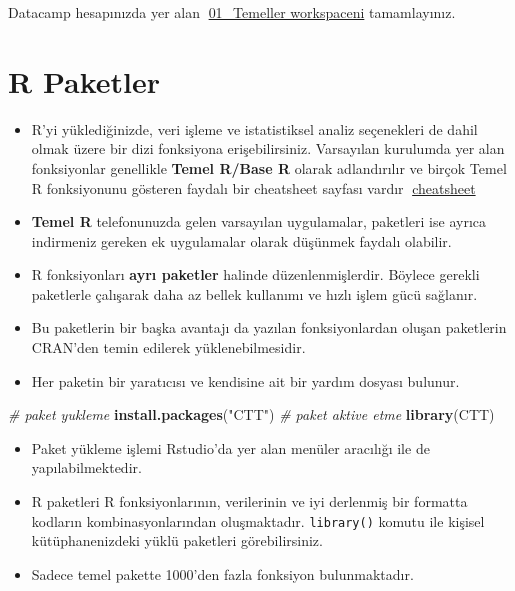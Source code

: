 \documentclass[
  oneside]{book}
\newenvironment{Shaded}{\begin{snugshade}}{\end{snugshade}}
\newcommand{\CommentTok}[1]{\textcolor[rgb]{0.56,0.35,0.01}{\textit{#1}}}
\newcommand{\FunctionTok}[1]{\textcolor[rgb]{0.13,0.29,0.53}{\textbf{#1}}}
\newcommand{\NormalTok}[1]{#1}
\newcommand{\StringTok}[1]{\textcolor[rgb]{0.31,0.60,0.02}{#1}}
\begin{document}
Datacamp hesapınızda yer alan 🔗\href{https://app.datacamp.com/workspace/w/27893d74-f669-4ea4-964d-d8c367b6345e/edit}{01\_Temeller workspaceni} tamamlayınız.

\hypertarget{r-paketler}{%
\chapter{R Paketler}\label{r-paketler}}

\begin{itemize}
\item
  R'yi yüklediğinizde, veri işleme ve istatistiksel analiz seçenekleri de dahil olmak üzere bir dizi fonksiyona erişebilirsiniz. Varsayılan kurulumda yer alan fonksiyonlar genellikle \textbf{Temel R/Base R} olarak adlandırılır ve birçok Temel R fonksiyonunu gösteren faydalı bir cheatsheet sayfası vardır 🔗\href{https://github.com/rstudio/cheatsheets/raw/main/base-r.pdf}{cheatsheet}
\item
  \textbf{Temel R} telefonunuzda gelen varsayılan uygulamalar, paketleri ise ayrıca indirmeniz gereken ek uygulamalar olarak düşünmek faydalı olabilir.
\item
  R fonksiyonları \textbf{ayrı paketler} halinde düzenlenmişlerdir. Böylece gerekli paketlerle çalışarak daha az bellek kullanımı ve hızlı işlem gücü sağlanır.
\item
  Bu paketlerin bir başka avantajı da yazılan fonksiyonlardan oluşan paketlerin CRAN'den temin edilerek yüklenebilmesidir.
\item
  Her paketin bir yaratıcısı ve kendisine ait bir yardım dosyası bulunur.
\end{itemize}

\begin{Shaded}
\begin{Highlighting}[]
\CommentTok{\# paket yukleme}
\FunctionTok{install.packages}\NormalTok{(}\StringTok{"CTT"}\NormalTok{)}
\CommentTok{\# paket aktive etme}
\FunctionTok{library}\NormalTok{(CTT)}
\end{Highlighting}
\end{Shaded}

\begin{itemize}
\item
  Paket yükleme işlemi Rstudio'da yer alan menüler aracılığı ile de yapılabilmektedir.
\item
  R paketleri R fonksiyonlarının, verilerinin ve iyi derlenmiş bir formatta kodların kombinasyonlarından oluşmaktadır. \texttt{library()} komutu ile kişisel kütüphanenizdeki yüklü paketleri görebilirsiniz.
\item
  Sadece temel pakette 1000'den fazla fonksiyon bulunmaktadır.
\end{itemize}
\end{document}
